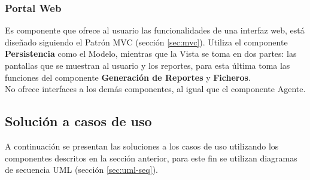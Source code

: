 \subsubsection{Portal Web}
Es componente que ofrece al usuario las funcionalidades de una interfaz web, está diseñado siguiendo el Patrón MVC (sección \ref{sec:mvc}). Utiliza el componente \textbf{Persistencia} como el Modelo, mientras que la Vista se toma en dos partes: las pantallas que se muestran al usuario y los reportes, para esta última toma las funciones del componente \textbf{Generación de Reportes} y \textbf{Ficheros}.\\
No ofrece interfaces a los demás componentes, al igual que el componente Agente.



\subsection{Solución a casos de uso}
A continuación se presentan las soluciones a los casos de uso utilizando los componentes descritos en la sección anterior, para este fin se utilizan diagramas de secuencia UML (sección \ref{sec:uml-seq}).

